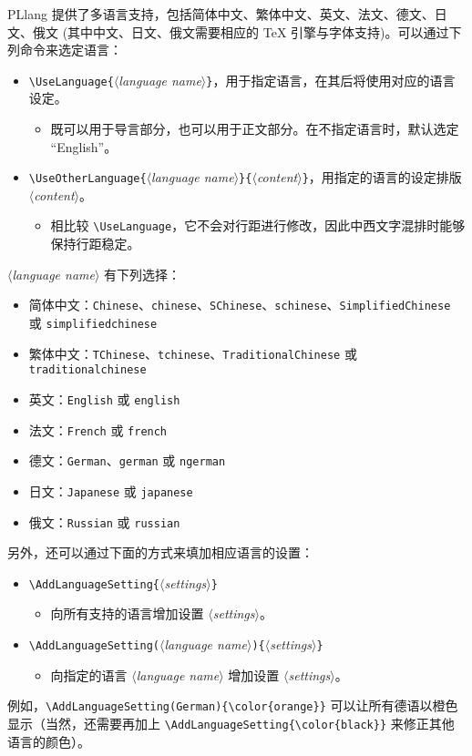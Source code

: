 \documentclass[allowbf]{lebhart}
\providecommand{\meta}[1]{$\langle${\normalfont\itshape#1}$\rangle$}
\providecommand{\PLlang}{\textsf{PLlang}}
\begin{document}
\PLlang{} 提供了多语言支持，包括简体中文、繁体中文、英文、法文、德文、日文、俄文 (其中中文、日文、俄文需要相应的 \TeX{} 引擎与字体支持)。可以通过下列命令来选定语言：
\begin{itemize}
    \item \lstinline|\UseLanguage{|\meta{language name}\lstinline|}|，用于指定语言，在其后将使用对应的语言设定。
    \begin{itemize}
        \item 既可以用于导言部分，也可以用于正文部分。在不指定语言时，默认选定 “English”。
    \end{itemize}
    \item \lstinline|\UseOtherLanguage{|\meta{language name}\lstinline|}{|\meta{content}\lstinline|}|，用指定的语言的设定排版 \meta{content}。
    \begin{itemize}
        \item 相比较 \lstinline|\UseLanguage|，它不会对行距进行修改，因此中西文字混排时能够保持行距稳定。
    \end{itemize}
\end{itemize}

\meta{language name} 有下列选择：
\begin{itemize}
    \item 简体中文：\texttt{Chinese}、\texttt{chinese}、\texttt{SChinese}、\texttt{schinese}、\texttt{SimplifiedChinese} 或 \texttt{simplifiedchinese}
    \item 繁体中文：\texttt{TChinese}、\texttt{tchinese}、\texttt{TraditionalChinese} 或 \texttt{traditionalchinese}
    \item 英文：\texttt{English} 或 \texttt{english}
    \item 法文：\texttt{French} 或 \texttt{french}
    \item 德文：\texttt{German}、\texttt{german} 或 \texttt{ngerman}
    \item 日文：\texttt{Japanese} 或 \texttt{japanese}
    \item 俄文：\texttt{Russian} 或 \texttt{russian}
\end{itemize}

另外，还可以通过下面的方式来填加相应语言的设置：
\begin{itemize}
    \item \lstinline|\AddLanguageSetting{|\meta{settings}\lstinline|}|
    \begin{itemize}
        \item 向所有支持的语言增加设置 \meta{settings}。
    \end{itemize}
    \item \lstinline|\AddLanguageSetting(|\meta{language name}\lstinline|){|\meta{settings}\lstinline|}|
    \begin{itemize}
        \item 向指定的语言 \meta{language name} 增加设置 \meta{settings}。
    \end{itemize}
\end{itemize}
例如，\lstinline|\AddLanguageSetting(German){\color{orange}}| 可以让所有德语以橙色显示（当然，还需要再加上 \lstinline|\AddLanguageSetting{\color{black}}| 来修正其他语言的颜色）。
\end{document}
